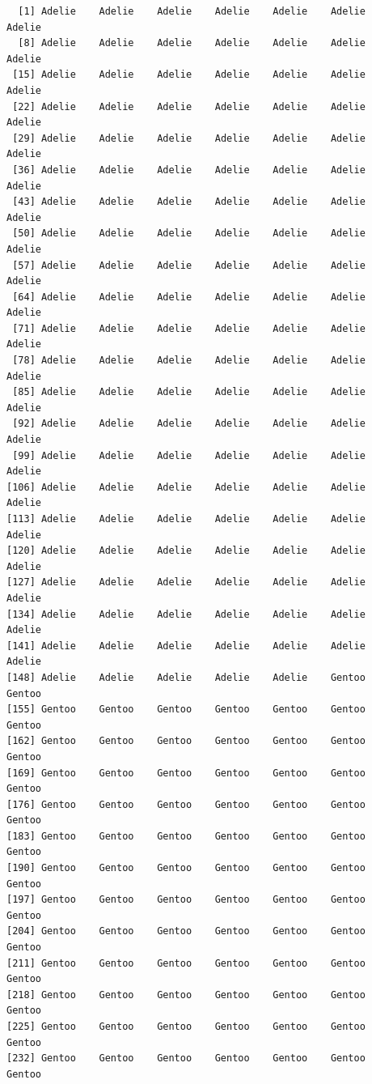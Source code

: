 \documentclass[
  letterpaper,
  DIV=11,
  numbers=noendperiod]{scrreprt}
\begin{document}
\begin{verbatim}
  [1] Adelie    Adelie    Adelie    Adelie    Adelie    Adelie    Adelie   
  [8] Adelie    Adelie    Adelie    Adelie    Adelie    Adelie    Adelie   
 [15] Adelie    Adelie    Adelie    Adelie    Adelie    Adelie    Adelie   
 [22] Adelie    Adelie    Adelie    Adelie    Adelie    Adelie    Adelie   
 [29] Adelie    Adelie    Adelie    Adelie    Adelie    Adelie    Adelie   
 [36] Adelie    Adelie    Adelie    Adelie    Adelie    Adelie    Adelie   
 [43] Adelie    Adelie    Adelie    Adelie    Adelie    Adelie    Adelie   
 [50] Adelie    Adelie    Adelie    Adelie    Adelie    Adelie    Adelie   
 [57] Adelie    Adelie    Adelie    Adelie    Adelie    Adelie    Adelie   
 [64] Adelie    Adelie    Adelie    Adelie    Adelie    Adelie    Adelie   
 [71] Adelie    Adelie    Adelie    Adelie    Adelie    Adelie    Adelie   
 [78] Adelie    Adelie    Adelie    Adelie    Adelie    Adelie    Adelie   
 [85] Adelie    Adelie    Adelie    Adelie    Adelie    Adelie    Adelie   
 [92] Adelie    Adelie    Adelie    Adelie    Adelie    Adelie    Adelie   
 [99] Adelie    Adelie    Adelie    Adelie    Adelie    Adelie    Adelie   
[106] Adelie    Adelie    Adelie    Adelie    Adelie    Adelie    Adelie   
[113] Adelie    Adelie    Adelie    Adelie    Adelie    Adelie    Adelie   
[120] Adelie    Adelie    Adelie    Adelie    Adelie    Adelie    Adelie   
[127] Adelie    Adelie    Adelie    Adelie    Adelie    Adelie    Adelie   
[134] Adelie    Adelie    Adelie    Adelie    Adelie    Adelie    Adelie   
[141] Adelie    Adelie    Adelie    Adelie    Adelie    Adelie    Adelie   
[148] Adelie    Adelie    Adelie    Adelie    Adelie    Gentoo    Gentoo   
[155] Gentoo    Gentoo    Gentoo    Gentoo    Gentoo    Gentoo    Gentoo   
[162] Gentoo    Gentoo    Gentoo    Gentoo    Gentoo    Gentoo    Gentoo   
[169] Gentoo    Gentoo    Gentoo    Gentoo    Gentoo    Gentoo    Gentoo   
[176] Gentoo    Gentoo    Gentoo    Gentoo    Gentoo    Gentoo    Gentoo   
[183] Gentoo    Gentoo    Gentoo    Gentoo    Gentoo    Gentoo    Gentoo   
[190] Gentoo    Gentoo    Gentoo    Gentoo    Gentoo    Gentoo    Gentoo   
[197] Gentoo    Gentoo    Gentoo    Gentoo    Gentoo    Gentoo    Gentoo   
[204] Gentoo    Gentoo    Gentoo    Gentoo    Gentoo    Gentoo    Gentoo   
[211] Gentoo    Gentoo    Gentoo    Gentoo    Gentoo    Gentoo    Gentoo   
[218] Gentoo    Gentoo    Gentoo    Gentoo    Gentoo    Gentoo    Gentoo   
[225] Gentoo    Gentoo    Gentoo    Gentoo    Gentoo    Gentoo    Gentoo   
[232] Gentoo    Gentoo    Gentoo    Gentoo    Gentoo    Gentoo    Gentoo   

\end{verbatim}
\end{document}
